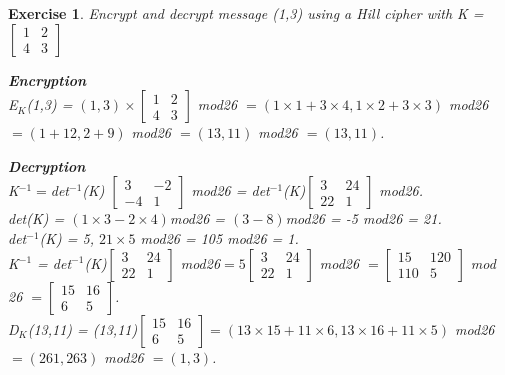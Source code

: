 \documentclass[a4paper, 12pt]{report}
\newtheorem{exercise}{\textbf{Exercise}}
\begin{document}
\begin{exercise}
	Encrypt and decrypt message (1,3) using a Hill cipher with K = $
	\begin{bmatrix}
	1 & 2\\
	4 & 3	
	\end{bmatrix}$
	
	\vspace{5mm}
	\textbf{Encryption}\\
	E$_K$(1,3) = $(1,3) \times 
	\begin{bmatrix}
	1 & 2\\
	4 & 3	
	\end{bmatrix}$ mod26 $= (1\times1+3\times4,1\times2+3\times3)$ mod26 $=(1+12,2+9)$ mod26 $=(13,11)$ mod26 $=(13,11)$.
	
	\vspace{5mm}
	\textbf{Decryption}\\
	K$^{-1} = $det$^{-1}$(K) $\begin{bmatrix}
	3 & -2\\
	-4 & 1	
	\end{bmatrix}$ mod26 = det$^{-1}$(K)$
	\begin{bmatrix}
	3 & 24\\
	22 & 1	
	\end{bmatrix}$ mod26.\\
	det(K) = $(1\times3-2\times4)$mod26 = $(3-8)$mod26 = -5 mod26 = 21.\\
	det$^{-1}$(K) = 5, $21\times5$ mod26 = 105 mod26 = 1.\\
	K$^{-1}$ = det$^{-1}$(K)$
	\begin{bmatrix}
	3 & 24\\
	22 & 1	
	\end{bmatrix}$ mod26$ = 5
	\begin{bmatrix}
	3 & 24\\
	22 & 1	
	\end{bmatrix}$ mod26 $=
	\begin{bmatrix}
	15 & 120\\
	110 & 5	
	\end{bmatrix}$ mod 26 $=
	\begin{bmatrix}
	15 & 16\\
	6 & 5	
	\end{bmatrix}$.\\
	D$_K$(13,11)  = (13,11)$
	\begin{bmatrix}
	15 & 16\\
	6 & 5	
	\end{bmatrix} = (13\times15+11\times6,13\times16+11\times5)$ mod26 $=(261,263)$ mod26 $=(1,3)$.
\end{exercise}
\end{document}

